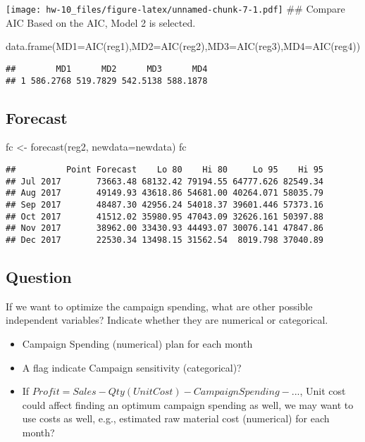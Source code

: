 \documentclass[
]{article}
\newenvironment{Shaded}{\begin{snugshade}}{\end{snugshade}}
\newcommand{\AttributeTok}[1]{\textcolor[rgb]{0.77,0.63,0.00}{#1}}
\newcommand{\FunctionTok}[1]{\textcolor[rgb]{0.00,0.00,0.00}{#1}}
\newcommand{\NormalTok}[1]{#1}
\newcommand{\OtherTok}[1]{\textcolor[rgb]{0.56,0.35,0.01}{#1}}
\providecommand{\tightlist}{%
  \setlength{\itemsep}{0pt}\setlength{\parskip}{0pt}}
\begin{document}
\texttt{[image: hw-10\_files/figure-latex/unnamed-chunk-7-1.pdf]} \#\#
Compare AIC Based on the AIC, Model 2 is selected.

\begin{Shaded}
\begin{Highlighting}[]
\FunctionTok{data.frame}\NormalTok{(}\AttributeTok{MD1=}\FunctionTok{AIC}\NormalTok{(reg1),}\AttributeTok{MD2=}\FunctionTok{AIC}\NormalTok{(reg2),}\AttributeTok{MD3=}\FunctionTok{AIC}\NormalTok{(reg3),}\AttributeTok{MD4=}\FunctionTok{AIC}\NormalTok{(reg4))}
\end{Highlighting}
\end{Shaded}

\begin{verbatim}
##        MD1      MD2      MD3      MD4
## 1 586.2768 519.7829 542.5138 588.1878
\end{verbatim}

\hypertarget{forecast}{%
\subsection{Forecast}\label{forecast}}

\begin{Shaded}
\begin{Highlighting}[]
\NormalTok{fc }\OtherTok{\textless{}{-}} \FunctionTok{forecast}\NormalTok{(reg2, }\AttributeTok{newdata=}\NormalTok{newdata)}
\NormalTok{fc}
\end{Highlighting}
\end{Shaded}

\begin{verbatim}
##          Point Forecast    Lo 80    Hi 80     Lo 95    Hi 95
## Jul 2017       73663.48 68132.42 79194.55 64777.626 82549.34
## Aug 2017       49149.93 43618.86 54681.00 40264.071 58035.79
## Sep 2017       48487.30 42956.24 54018.37 39601.446 57373.16
## Oct 2017       41512.02 35980.95 47043.09 32626.161 50397.88
## Nov 2017       38962.00 33430.93 44493.07 30076.141 47847.86
## Dec 2017       22530.34 13498.15 31562.54  8019.798 37040.89
\end{verbatim}

\hypertarget{question}{%
\subsection{Question}\label{question}}

If we want to optimize the campaign spending, what are other possible
independent variables? Indicate whether they are numerical or
categorical.

\begin{itemize}
\tightlist
\item
  Campaign Spending (numerical) plan for each month
\item
  A flag indicate Campaign sensitivity (categorical)?
\item
  If \(Profit = Sales - Qty(UnitCost) - CampaignSpending - ...\), Unit
  cost could affect finding an optimum campaign spending as well, we may
  want to use costs as well, e.g., estimated raw material cost
  (numerical) for each month?
\end{itemize}
\end{document}
